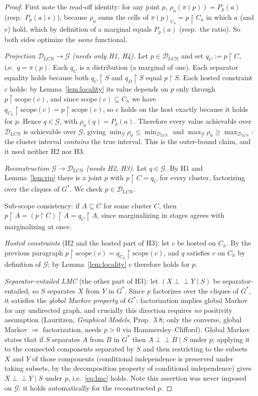 \documentclass[11pt]{article}
\theoremstyle{definition}
\newcommand{\indep}{\perp\!\!\!\perp}
\newcommand{\DLCN}{\mathcal{D}_{\mathrm{LCN}}}
\newcommand{\restr}{\!\restriction\!}
\newcommand{\readoff}{\rho}
\begin{document}
\begin{proof}
First note the read-off identity: for any joint $p$, $\readoff_a(\pi(p))=P_p(a)$ (resp.\
$P_p(a\mid e)$), because $\readoff_a$ sums the cells of $\pi(p)_{C_a}=p\restr C_a$ in which $a$ (and
$e$) hold, which by definition of a marginal equals $P_p(a)$ (resp.\ the ratio). So both sides
optimize the \emph{same} functional.

\emph{Projection $\DLCN\to\mathcal G$ (needs only H1, H4).} Let $p\in\DLCN$ and set
$q_C:=p\restr C$, i.e.\ $q=\pi(p)$. Each $q_C$ is a distribution (a marginal of one). Each separator
equality holds because both $q_C\restr S$ and $q_D\restr S$ equal $p\restr S$. Each hosted constraint
$c$ holds: by Lemma~\ref{lem:locality} its value depends on $p$ only through
$p\restr\mathrm{scope}(c)$, and since $\mathrm{scope}(c)\subseteq C_h$ we have
$q_{C_h}\restr\mathrm{scope}(c)=p\restr\mathrm{scope}(c)$, so $c$ holds on the host exactly because it
holds for $p$. Hence $q\in\mathcal G$, with $\readoff_a(q)=P_p(a)$. Therefore every value achievable
over $\DLCN$ is achievable over $\mathcal G$, giving
$\min_{\mathcal G}\readoff_a\le\min_{\DLCN}$ and $\max_{\mathcal G}\readoff_a\ge\max_{\DLCN}$: the
cluster interval \emph{contains} the true interval. This is the outer-bound claim, and it used neither
H2 nor H3.

\emph{Reconstruction $\mathcal G\to\DLCN$ (needs H2, H3).} Let $q\in\mathcal G$. By H1 and
Lemma~\ref{lem:rip} there is a joint $p$ with $p\restr C=q_C$ for every cluster, factorizing over the
cliques of $G^\ast$. We check $p\in\DLCN$.

Sub-scope consistency: if $A\subseteq C$ for some cluster $C$, then $p\restr A=(p\restr C)\restr A
=q_C\restr A$, since marginalizing in stages agrees with marginalizing at once.

\emph{Hosted constraints} (H2 and the hosted part of H3): let $c$ be hosted on $C_h$. By the previous
paragraph $p\restr\mathrm{scope}(c)=q_{C_h}\restr\mathrm{scope}(c)$, and $q$ satisfies $c$ on
$C_h$ by definition of $\mathcal G$; by Lemma~\ref{lem:locality} $c$ therefore holds for $p$.

\emph{Separator-entailed LMC} (the other part of H3): let $(X\indep Y\mid S)$ be separator-entailed,
so $S$ separates $X$ from $Y$ in $G^\ast$. Since $p$ factorizes over the cliques of $G^\ast$, it
satisfies the \emph{global Markov property} of $G^\ast$: factorization implies global Markov for any
undirected graph, and crucially this direction requires \emph{no} positivity assumption (Lauritzen,
\emph{Graphical Models}, Prop.~3.8; only the converse, global Markov $\Rightarrow$ factorization, needs
$p>0$ via Hammersley--Clifford). Global Markov states that if $S$ separates $A$ from $B$ in $G^\ast$
then $A\indep B\mid S$ under $p$; applying it to the connected components separated by $S$ and then
restricting to the subsets $X$ and $Y$ of those components (conditional independence is preserved
under taking subsets, by the decomposition property of conditional independence) gives
$X\indep Y\mid S$ under $p$, i.e.\ \eqref{eq:lmc} holds. Note this assertion was never imposed on
$\mathcal G$: it holds automatically for the reconstructed $p$.


\end{proof}
\end{document}
